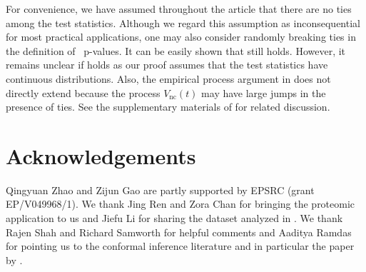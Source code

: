 \documentclass[a4paper,11pt]{article}
\newcommand{\zg}[1]{{\color{blue} [ZG: #1]}}
\theoremstyle{plain}
\theoremstyle{definition}
\def\calI{\mathcal{I}}
\theoremstyle{plain}
\newcommand{\testStatistics}[1]{{T_{#1}}}
\newcommand{\nickname}{{\text{RANC}}}
\newcommand{\hypothesisIndex}[1]{{\calI_{#1}}}
\newcommand{\ncFalsePositive}{{V_{\text{nc}}}}
\newcommand{\FDR}{\text{FDR}}
\newcommand{\FDRLevel}{q}
\newcommand{\stoppingTime}{{\tau_q}}
\begin{document}
For convenience, we have assumed throughout the article that there are
no ties among the test statistics. Although we regard this assumption
as inconsequential for most practical applications, one may also
consider randomly breaking ties in the definition of
\nickname~p-values. It
can be easily shown that  still holds.
However, it remains unclear if  holds
as our proof assumes that the
test statistics have continuous distributions.
Also, the empirical process argument in 
does not directly extend because the process $\ncFalsePositive(t)$
may have large jumps in the presence of ties. See the supplementary
materials of \textcite{bates21_testin_outlier_with_confor_p_values}
for related discussion.



\section*{Acknowledgements}
Qingyuan Zhao and Zijun Gao are partly supported by EPSRC (grant
EP/V049968/1). We thank Jing Ren and Zora
Chan for bringing the proteomic application to us and Jiefu Li for
sharing the dataset analyzed in
. We thank Rajen Shah and
Richard Samworth for helpful comments and Aaditya Ramdas for pointing
us to the conformal inference literature and in particular the paper
by \textcite{bates21_testin_outlier_with_confor_p_values}.
\end{document}

